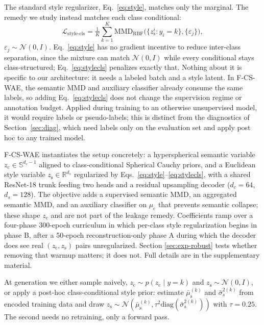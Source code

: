 \documentclass[letterpaper]{article}
\newcommand{\ours}{F-CS-WAE}
\newcommand{\zc}{z_{\mathrm{c}}}
\newcommand{\zs}{z_{\mathrm{s}}}
\newcommand{\muc}{\mu_{\mathrm{c}}}
\newcommand{\mus}{\mu_{\mathrm{s}}}
\newcommand{\R}{\mathbb{R}}
\newcommand{\MMD}{\mathrm{MMD}}
\begin{document}
The standard style regularizer, Eq.~\ref{eq:style}, matches only the
marginal. The remedy we study instead matches each class conditional:
\begin{equation}
\mathcal L_{\text{style-cls}} = \tfrac1K\textstyle\sum_{k=1}^{K}
\MMD_{\mathrm{RBF}}\bigl(\{\zs^i:y_i{=}k\},\{\varepsilon_j\}\bigr),
\label{eq:stylecls}
\end{equation}
$\varepsilon_j\sim\mathcal N(0,I)$. Eq.~\ref{eq:style} has no gradient
incentive to reduce inter-class separation, since the mixture can match
$\mathcal N(0,I)$ while every conditional stays class-structured;
Eq.~\ref{eq:stylecls} penalizes exactly that. Nothing about it is specific to
our architecture: it needs a labeled batch and a style latent. In \ours{},
the semantic MMD and auxiliary classifier already consume the same labels,
so adding Eq.~\ref{eq:stylecls} does not change the supervision regime or
annotation budget. Applied during training to an otherwise unsupervised
model, it would require labels or pseudo-labels; this is distinct from the
diagnostics of Section~\ref{sec:diag}, which need labels only on the
evaluation set and apply post hoc to any trained model.

\ours{} instantiates the setup concretely: a hyperspherical semantic variable
$\zc\in\mathbb S^{d_c-1}$ aligned to class-conditional Spherical Cauchy
priors, and a Euclidean style variable $\zs\in\R^{d_s}$ regularized by
Eqs.~\ref{eq:style}--\ref{eq:stylecls}, with a shared ResNet-18 trunk feeding
two heads and a residual upsampling decoder ($d_c{=}64$, $d_s{=}128$). The
objective adds a supervised semantic MMD, an aggregated semantic MMD, and an
auxiliary classifier on $\muc$ that prevents semantic collapse; these shape
$\zc$ and are not part of the leakage remedy. Coefficients ramp over a
four-phase 300-epoch curriculum in which per-class style regularization
begins in phase B, after a 50-epoch reconstruction-only phase A during which
the decoder does see real $(\zc,\zs)$ pairs unregularized. Section
\ref{sec:exp-robust} tests whether removing that warmup matters; it does not.
Full details are in the supplementary material.

At generation we either sample naively, $\zc\sim p(\zc\mid y{=}k)$ and
$\zs\sim\mathcal N(0,I)$, or apply a post-hoc class-conditional style prior:
estimate $\bar\mus^{(k)}$ and $\bar\sigma_s^{2(k)}$ from encoded training
data and draw $\zs\sim\mathcal N(\bar\mus^{(k)},\tau^2\mathrm{diag}(\bar\sigma_s^{2(k)}))$
with $\tau{=}0.25$. The second needs no retraining, only a forward pass.
\end{document}
